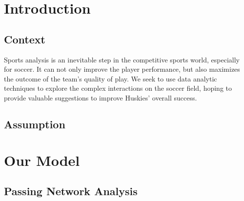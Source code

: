 \documentclass[12pt]{article}
\begin{document}

\clearpage
\pagestyle{fancy}
\newpage
\setcounter{page}{1}
\tableofcontents
\newpage
\section{Introduction}
\subsection{Context}
Sports analysis is an inevitable step in the competitive sports world, especially for soccer. It can not only improve the player performance, but also maximizes the outcome of the team's quality of play. We seek to use data analytic techniques to explore the complex interactions on the soccer field, hoping to provide valuable suggestions to improve Huskies’ overall success. 
\subsection{Assumption}
\newpage
\section{Our Model}
\subsection{Passing Network Analysis}
\end{document}
